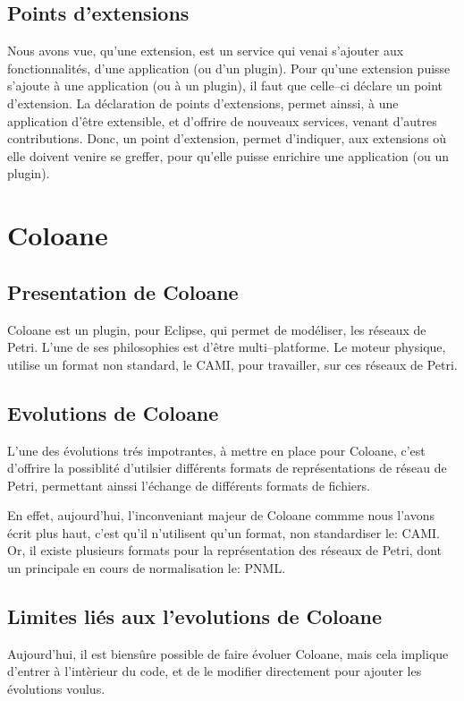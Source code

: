 \documentclass{article}
\begin{document}
\subsection{Points d'extensions}
Nous avons vue, qu'une extension, est un service qui venai s'ajouter aux 
fonctionnalités, d'une application (ou d'un plugin). Pour qu'une extension 
puisse s'ajoute à une application (ou à un plugin), il faut que celle--ci 
déclare un point d'extension. La déclaration de points d'extensions, permet 
ainssi, à une application d'être extensible, et d'offrire de nouveaux services, 
venant d'autres contributions. Donc, un point d'extension, permet d'indiquer, 
aux extensions où elle doivent venire se greffer, pour qu'elle puisse enrichire 
une application (ou un plugin).

\newpage

\section{Coloane}

\subsection{Presentation de Coloane}
Coloane est un plugin, pour Eclipse, qui permet de modéliser, les réseaux de 
Petri. L'une de ses philosophies est d'être multi--platforme. Le moteur 
physique, utilise un format non standard, le CAMI, pour travailler, sur ces 
réseaux de Petri. 

\subsection{Evolutions de Coloane}
L'une des évolutions trés impotrantes, à mettre en place pour Coloane, c'est 
d'offrire la possiblité d'utilsier différents formats de représentations de 
réseau de Petri, permettant ainssi l'échange de différents formats de fichiers.

En effet, aujourd'hui, l'inconveniant majeur de Coloane commme nous l'avons 
écrit plus haut, c'est qu'il n'utilisent qu'un format, non standardiser le: 
CAMI. Or, il existe plusieurs formats pour la représentation des réseaux de 
Petri, dont un principale en cours de normalisation le: PNML.

\subsection{Limites liés aux l'evolutions de Coloane}
Aujourd'hui, il est biensûre possible de faire évoluer Coloane, mais cela 
implique d'entrer à l'intèrieur du code, et de le modifier directement pour 
ajouter les évolutions voulus.
\end{document}
